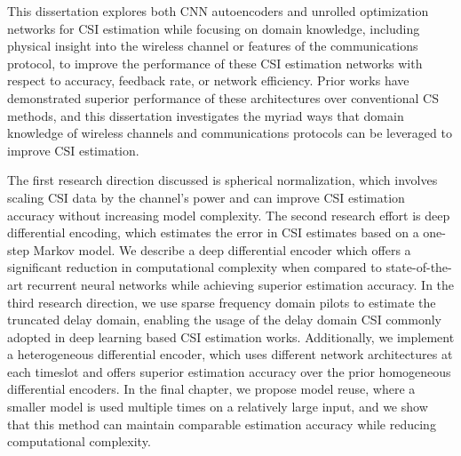 This dissertation explores both CNN autoencoders and unrolled optimization networks for CSI estimation while focusing on domain knowledge, including physical insight into the wireless channel or features of the communications protocol, to improve the performance of these CSI estimation networks with respect to accuracy, feedback rate, or network efficiency. Prior works have demonstrated superior performance of these architectures over conventional CS methods, and this dissertation investigates the myriad ways that domain knowledge of wireless channels and communications protocols can be leveraged to improve CSI estimation.

The first research direction discussed is spherical normalization, which involves scaling CSI data by the channel's power and can improve CSI estimation accuracy without increasing model complexity. The second research effort is deep differential encoding, which estimates the error in CSI estimates based on a one-step Markov model. We describe a deep differential encoder which offers a significant reduction in computational complexity when compared to state-of-the-art recurrent neural networks while achieving superior estimation accuracy. In the third research direction, we use sparse frequency domain pilots to estimate the truncated delay domain, enabling the usage of the delay domain CSI commonly adopted in deep learning based CSI estimation works. Additionally, we implement a heterogeneous differential encoder, which uses different network architectures at each timeslot and offers superior estimation accuracy over the prior homogeneous differential encoders. In the final chapter, we propose model reuse, where a smaller model is used multiple times on a relatively large input, and we show that this method can maintain comparable estimation accuracy while reducing computational complexity.